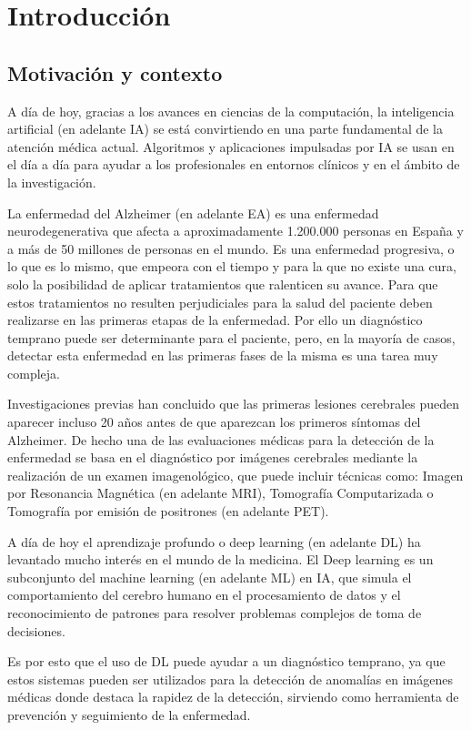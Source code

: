 \chapter{Introducción}\label{ch:introduccion}


\section{Motivación y contexto}\label{sec:motivacion-y-contexto}
A día de hoy, gracias a los avances en ciencias de la computación, la inteligencia artificial (en adelante IA) se está
convirtiendo en una parte fundamental de la atención médica actual.
Algoritmos y aplicaciones impulsadas por IA se usan en el día a día para ayudar a los profesionales en entornos clínicos
y en el ámbito de la investigación.

La enfermedad del Alzheimer (en adelante EA)  es una enfermedad neurodegenerativa que afecta a aproximadamente
1.200.000 personas en España y a más de 50 millones de personas en el mundo.
Es una enfermedad progresiva, o lo que es lo mismo, que empeora con el tiempo y para la que no existe una cura, solo
la posibilidad de aplicar tratamientos que ralenticen su avance.
Para que estos tratamientos no resulten perjudiciales para la salud del paciente deben realizarse en las primeras etapas
de la enfermedad.
Por ello un diagnóstico temprano puede ser determinante para el paciente, pero, en la mayoría de casos, detectar esta
enfermedad en las primeras fases de la misma es una tarea muy compleja.

Investigaciones previas han concluido que las primeras lesiones cerebrales pueden aparecer incluso 20 años antes de que
aparezcan los primeros síntomas del Alzheimer.
De hecho una de las evaluaciones médicas para la detección de la enfermedad se basa en el diagnóstico por imágenes
cerebrales mediante la realización de un examen imagenológico, que puede incluir técnicas como: Imagen por Resonancia
Magnética (en adelante MRI), Tomografía Computarizada o Tomografía por emisión de positrones (en adelante PET).

A día de hoy el aprendizaje profundo o deep learning (en adelante DL)  ha levantado mucho interés en el mundo de la
medicina.
El Deep learning es un subconjunto del machine learning (en adelante ML) en IA, que simula el comportamiento del cerebro
humano en el procesamiento de datos y el reconocimiento de patrones para resolver problemas complejos de toma de
decisiones.

Es por esto que el uso de DL puede ayudar a un diagnóstico temprano, ya que estos sistemas pueden ser utilizados para la
detección de anomalías en imágenes médicas donde destaca la rapidez de la detección, sirviendo como herramienta de
prevención y seguimiento de la enfermedad.

